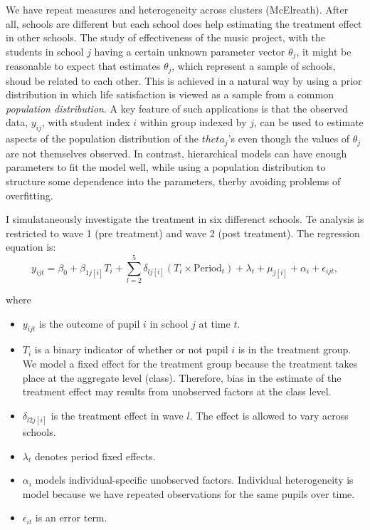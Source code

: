 \documentclass[a4, 12pt]{article}
\providecommand{\tightlist}{%
  \setlength{\itemsep}{0pt}\setlength{\parskip}{0pt}}
\begin{document}
We have repeat measures and heterogeneity across clusters (McElreath). After all, schools are different but each school does help estimating the treatment effect in other schools.
The study of effectiveness of the music project, with the students in school \(j\) having a certain unknown parameter vector \(\theta_j\), it might be reasonable to expect that estimates \(\theta_j\), which represent a sample of schools, shoud be related to each other. This is achieved in a natural way by using a prior distribution in which life satisfaction is viewed as a sample from a common \emph{population distribution}. A key feature of such applications is that the observed data, \(y_{ij}\), with student index \(i\) within group indexed by \(j\), can be used to estimate aspects of the population distribution of the \(theta_j\)'s even though the values of \(\theta_j\) are not themselves observed. In contrast, hierarchical models can have enough parameters to fit the model well, while using a population distribution to structure some dependence into the parameters, therby avoiding problems of overfitting.

I simulataneously investigate the treatment in six differenct schools. Te analysis is restricted to wave 1 (pre treatment) and wave 2 (post treatment). The regression equation is:
\[
y_{ijt} = \beta_0 + \beta_{1j[i]} T_i + \sum\limits_{l=2}^5\delta_{lj[i]} (T_{i} \times \text{Period}_{t}) + \lambda_t + \mu_{j[i]} + \alpha_{i} + \epsilon_{ijt},
\]

where

\begin{itemize}
\tightlist
\item
  \(y_{ijt}\) is the outcome of pupil \(i\) in school \(j\) at time \(t\).
\item
  \(T_{i}\) is a binary indicator of whether or not pupil \(i\) is in the treatment group. We model a fixed effect for the treatment group because the treatment takes place at the aggregate level (class). Therefore, bias in the estimate of the treatment effect may results from unobserved factors at the class level.
\item
  \(\delta_{l2j[i]}\) is the treatment effect in wave \(l\). The effect is allowed to vary across schools.
\item
  \(\lambda_t\) denotes period fixed effects.
\item
  \(\alpha_{i}\) models individual-specific unobserved factors. Individual heterogeneity is model because we have repeated observations for the same pupils over time.
\item
  \(\epsilon_{it}\) is an error term.
\end{itemize}
\end{document}
